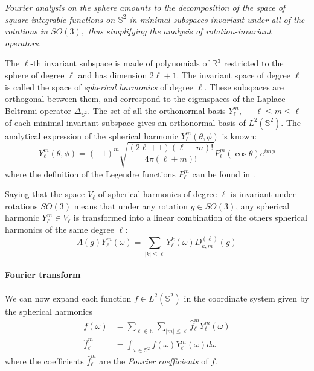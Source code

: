 \vspace{0.2cm}
\textit{Fourier analysis on the sphere amounts to the decomposition of the space of square integrable functions on \(\mathbb S^{2}\) in minimal subspaces invariant under all of the rotations in \(S O(3),\) thus simplifying the analysis of rotation-invariant operators.}
\vspace{0.2cm}

The $\ell$-th invariant subspace is made of polynomials of $\mathbb R^3$ restricted to the sphere of degree $\ell$ and has dimension $2\ell+1$. The invariant space of degree $\ell$ is called the space of \textit{spherical harmonics} of degree $\ell$. These subspaces are orthogonal between them, and correspond to the eigenspaces of the Laplace-Beltrami operator $\Delta_{\mathbb S^2}$. The set of all the orthonormal basis $Y_\ell^m,\ -\ell\leq m\leq\ell$ of each minimal invariant subspace gives an orthonormal basis of $L^2(\mathbb S^2)$. The analytical expression of the spherical harmonic $Y_\ell^m(\theta, \phi)$ is known:
\begin{equation}\label{eq:spherical harmonics}
	Y_\ell^m(\theta, \phi) = (-1)^{m} \sqrt{\frac{(2 \ell+1)(\ell-m) !}{4 \pi(\ell+m) !}} P_{\ell}^{m}(\cos \theta) e^{i m \phi}
\end{equation}
where the definition of the Legendre functions $P_{\ell}^{m}$ can be found in \cite{Driscoll:1994:CFT:184069.184073}. 
\vspace{0.5cm}
\begin{remark}
	Saying that the space $V_\ell$ of spherical harmonics of degree $\ell$ is invariant under rotations $SO(3)$ means that under any rotation $g\in SO(3)$, any spherical harmonic $Y_\ell^m\in V_\ell$ is transformed into a linear combination of the others spherical harmonics of the same degree $\ell$:
	$$
	\Lambda(g) Y_{\ell}^{m}(\omega)=\sum_{|k| \leq \ell} Y_{\ell}^{k}(\omega) D_{k, m}^{(\ell)}(g)
	$$
\end{remark}
\vspace{0.5cm}

\paragraph{Fourier transform}
We can now expand each function $f\in L^2(\mathbb S^2)$ in the coordinate system given by the spherical harmonics 
\begin{align}
	f(\omega) &= \sum_{\ell\in\mathbb N}\sum_{|m|\leq \ell}\hat f_\ell^mY_\ell^m(\omega)\\
	\hat f_\ell^m &=\int_{\omega\in\mathbb S^2}f(\omega)Y_\ell^m(\omega)d\omega
\end{align}
where the coefficients $\hat f_\ell^m$ are the \textit{Fourier coefficients} of $f$.

